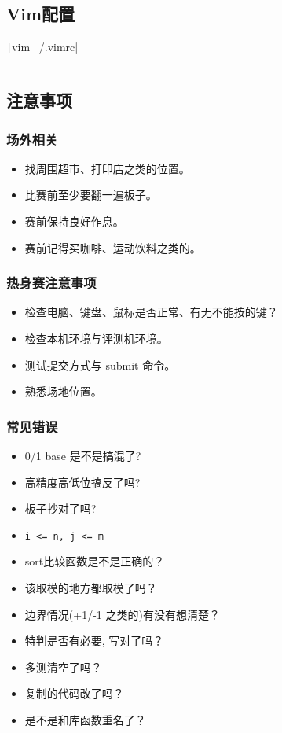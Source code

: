 \documentclass[a4paper, twoside]{article}
\begin{document}
\subsection{Vim配置}
\texttt|vim ~/.vimrc|
\inputminted{bash}{../src/附录/vim配置.sh}

\subsection{注意事项}

    \subsubsection{场外相关}
    \begin{itemize}
        \item 找周围超市、打印店之类的位置。
        \item 比赛前至少要翻一遍板子。
        \item 赛前保持良好作息。
        \item 赛前记得买咖啡、运动饮料之类的。
    \end{itemize}

    \subsubsection{热身赛注意事项}
    \begin{itemize}
        \item 检查电脑、键盘、鼠标是否正常、有无不能按的键？
        \item 检查本机环境与评测机环境。
        \item 测试提交方式与 submit 命令。
        \item 熟悉场地位置。
    \end{itemize}

    \subsubsection{常见错误}
    \begin{itemize}
        \item 0/1 base 是不是搞混了?
        \item 高精度高低位搞反了吗?
        \item 板子抄对了吗?
        \item \texttt{i <= n, j <= m}
        \item sort比较函数是不是正确的？
        \item 该取模的地方都取模了吗？
        \item 边界情况(+1/-1 之类的)有没有想清楚？
        \item 特判是否有必要, 写对了吗？
        \item 多测清空了吗？
        \item 复制的代码改了吗？
        \item 是不是和库函数重名了？
    \end{itemize}
\end{document}
